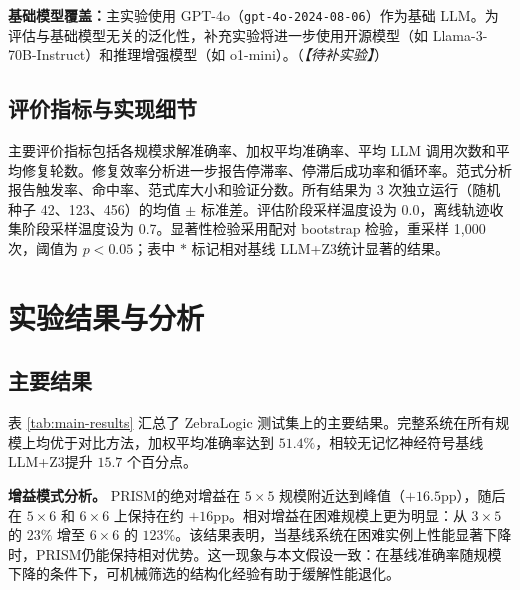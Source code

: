 \documentclass[UTF8,a4paper,12pt]{ctexart}
\newcommand{\PRISM}{PRISM}
\newcommand{\zthree}{Z3}
\begin{document}
\textbf{基础模型覆盖：}主实验使用 GPT-4o（\texttt{gpt-4o-2024-08-06}）作为基础 LLM。为评估与基础模型无关的泛化性，补充实验将进一步使用开源模型（如 Llama-3-70B-Instruct）和推理增强模型（如 o1-mini）。（\textit{【待补实验】}）

\subsection{评价指标与实现细节}

主要评价指标包括各规模求解准确率、加权平均准确率、平均 LLM 调用次数和平均修复轮数。修复效率分析进一步报告停滞率、停滞后成功率和循环率。范式分析报告触发率、命中率、范式库大小和验证分数。所有结果为 3 次独立运行（随机种子 42、123、456）的均值 $\pm$ 标准差。评估阶段采样温度设为 0.0，离线轨迹收集阶段采样温度设为 0.7。显著性检验采用配对 bootstrap 检验，重采样 1,000 次，阈值为 \(p<0.05\)；表中 \(*\) 标记相对基线 LLM+\zthree 统计显著的结果。

\section{实验结果与分析}

\subsection{主要结果}

表 \ref{tab:main-results} 汇总了 ZebraLogic 测试集上的主要结果。完整系统在所有规模上均优于对比方法，加权平均准确率达到 \(51.4\%\)，相较无记忆神经符号基线 LLM+\zthree 提升 \(15.7\) 个百分点。

\textbf{增益模式分析。} \PRISM 的绝对增益在 \(5\times5\) 规模附近达到峰值（\(+16.5\)pp），随后在 \(5\times6\) 和 \(6\times6\) 上保持在约 \(+16\)pp。相对增益在困难规模上更为明显：从 \(3\times5\) 的 \(23\%\) 增至 \(6\times6\) 的 \(123\%\)。该结果表明，当基线系统在困难实例上性能显著下降时，\PRISM 仍能保持相对优势。这一现象与本文假设一致：在基线准确率随规模下降的条件下，可机械筛选的结构化经验有助于缓解性能退化。
\end{document}
